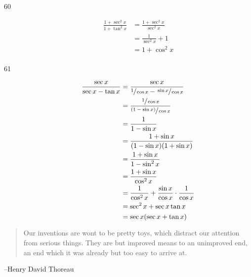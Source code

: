 \documentclass{exam}
\begin{document}
\begin{description}
      \item[60] 
        \begin{align*}
          \frac{1 + \sec^2 x}{1 + \tan^2 x} & = \frac{1 + \sec^2 x}{\sec^2 x} \\
                                            & = \frac{1}{\sec^2 x} + 1 \\
                                            & = 1 + \cos^2 x \\
        \end{align*}

      \item[61] 
        \begin{align*}
          \frac{\sec x}{\sec x - \tan x} & = \frac{\sec x}{\sfrac{1}{\cos x} - \sfrac{\sin x}{\cos x}} \\
                                         & = \frac{\sfrac{1}{\cos x}}{\sfrac{(1 - \sin x)}{\cos x}} \\
                                         & = \frac{1}{1 - \sin x} \\
                                         & = \frac{1 + \sin x}{(1 - \sin x)(1 + \sin x)} \\
                                         & = \frac{1 + \sin x}{1 - \sin^2 x} \\
                                         & = \frac{1 + \sin x}{\cos^2 x} \\
                                         & = \frac{1}{\cos^2 x} + \frac{\sin x}{\cos x} \cdot \frac{1}{\cos x} \\
                                         & = \sec^2 x + \sec x \tan x \\
                                         & = \sec x ( \sec x + \tan x ) \\
        \end{align*}

    \end{description}

  \else
    \vspace{5 cm}

    \begin{quote}
      \begin{em}
        Our inventions are wont to be pretty toys, which distract our attention from serious things. They are but
        improved means to an unimproved end, an end which it was already but too easy to arrive at.
      \end{em}
    \end{quote}
    \hspace{1 cm} --Henry David Thoreau
  \fi
\end{document}
